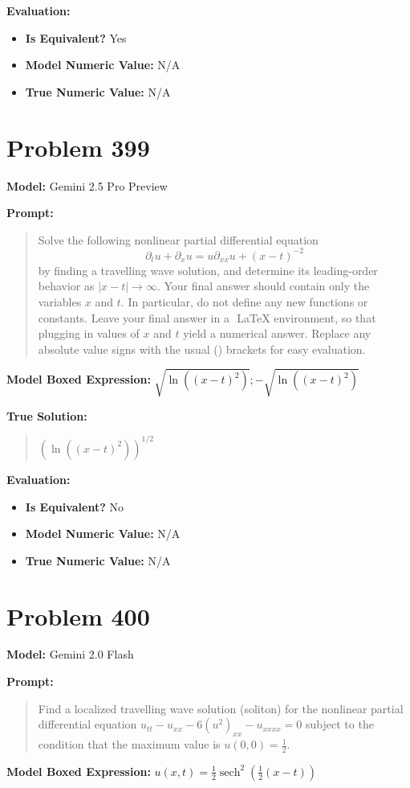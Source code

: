 \documentclass{article}
\begin{document}
\textbf{Evaluation:}
\begin{itemize}
\item \textbf{Is Equivalent?} Yes
\item \textbf{Model Numeric Value:} N/A
\item \textbf{True Numeric Value:} N/A
\end{itemize}
\vspace{1cm}
\section*{Problem 399}
\textbf{Model:} Gemini 2.5 Pro Preview

\textbf{Prompt:}
\begin{quote}
Solve the following nonlinear partial differential equation $$\partial_t u + \partial_x u = u \partial_{xx}u + (x-t)^{-2}$$by finding a travelling wave solution, and determine its leading-order behavior as $|x-t| \to \infty$. Your final answer should contain only the variables $x$ and $t$. In particular, do not define any new functions or constants. Leave your final answer in a $\boxed{}$ LaTeX environment, so that plugging in values of $x$ and $t$ yield a numerical answer. Replace any absolute value signs with the usual () brackets for easy evaluation.
\end{quote}
\textbf{Model Boxed Expression:} $\sqrt{\ln((x-t)^2)}; -\sqrt{\ln((x-t)^2)}$

\textbf{True Solution:}
\begin{quote}
$(\ln((x-t)^2))^{1/2}$
\end{quote}

\textbf{Evaluation:}
\begin{itemize}
\item \textbf{Is Equivalent?} No
\item \textbf{Model Numeric Value:} N/A
\item \textbf{True Numeric Value:} N/A
\end{itemize}
\vspace{1cm}
\section*{Problem 400}
\textbf{Model:} Gemini 2.0 Flash

\textbf{Prompt:}
\begin{quote}
Find a localized travelling wave solution (soliton) for the nonlinear partial differential equation $u_{tt} - u_{xx} - 6 (u^2)_{xx} - u_{xxxx}=0$ subject to the condition that the maximum value is $u(0,0) = \frac{1}{2}$.
\end{quote}
\textbf{Model Boxed Expression:} $u(x,t) = \frac{1}{2} \operatorname{sech}^2\left(\frac{1}{2}(x-t)\right)$
\end{document}
